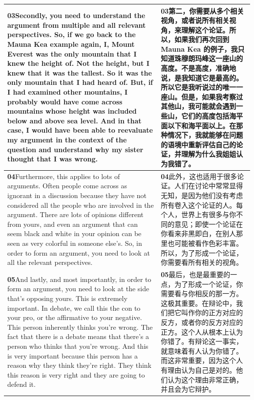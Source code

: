 \documentclass[UTF8,zihao=-4,fontset=fandol]{ctexart}
\newcommand{\TranscriptColumn}{\raggedright\arraybackslash\hyphenpenalty=10000\exhyphenpenalty=10000\sloppy}
\begin{document}
\begin{longtable}{>{\TranscriptColumn}p{} >{\TranscriptColumn}p{}}
\textbf{03}\quad Secondly, you need to understand the argument from multiple and all relevant perspectives. So, if we go back to the Mauna Kea example again, I, Mount Everest was the only mountain that I knew the height of. Not the height, but I knew that it was the tallest. So it was the only mountain that I had heard of. But, if I had examined other mountains, I probably would have come across mountains whose height was included below and above sea level. And in that case, I would have been able to reevaluate my argument in the context of the question and understand why my sister thought that I was wrong. & \textbf{03}\quad 第二，你需要从多个相关视角，或者说所有相关视角，来理解这个论证。所以，如果我们再次回到 Mauna Kea 的例子，我只知道珠穆朗玛峰这一座山的高度。不是高度，准确地说，是我知道它是最高的。所以它是我听说过的唯一一座山。但是，如果我考察过其他山，我可能就会遇到一些山，它们的高度包括海平面以下和海平面以上。在那种情况下，我就能够在问题的语境中重新评估自己的论证，并理解为什么我姐姐认为我错了。 \\ \hline
\textbf{04}\quad Furthermore, this applies to lots of arguments. Often people come across as ignorant in a discussion because they have not considered all the people who are involved in the argument. There are lots of opinions different from yours, and even an argument that can seem black and white in your opinion can be seen as very colorful in someone else's. So, in order to form an argument, you need to look at all the relevant perspectives. & \textbf{04}\quad 此外，这也适用于很多论证。人们在讨论中常常显得无知，是因为他们没有考虑所有卷入这个论证的人。每个人，世界上有很多与你不同的意见；即使一个论证在你看来非黑即白，在别人那里也可能被看作色彩丰富。所以，为了形成一个论证，你需要看所有相关的视角。 \\ \hline
\textbf{05}\quad And lastly, and most importantly, in order to form an argument, you need to look at the side that's opposing yours. This is extremely important. In debate, we call this the con to your pro, or the affirmative to your negative. This person inherently thinks you're wrong. The fact that there is a debate means that there's a person who thinks that you're wrong. And this is very important because this person has a reason why they think they're right. They think this reason is very right and they are going to defend it. & \textbf{05}\quad 最后，也是最重要的一点，为了形成一个论证，你需要看与你相反的那一方。这极其重要。在辩论中，我们把它叫作你的正方对应的反方，或者你的反方对应的正方。这个人从根本上认为你错了。有辩论这一事实，就意味着有人认为你错了。而这非常重要，因为这个人有理由认为自己是对的。他们认为这个理由非常正确，并且会为它辩护。 \\ \hline

\end{longtable}
\end{document}
